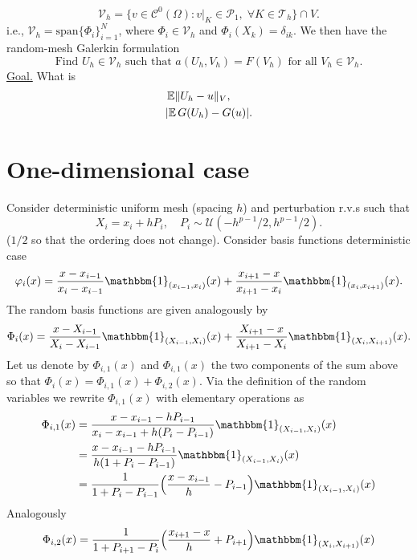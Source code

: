 \documentclass{siamart1116}
\numberwithin{theorem}{section}
\DeclarePairedDelimiter{\abs}{\lvert}{\rvert}
\DeclarePairedDelimiter{\norm}{\|}{\|}
\renewcommand{\phi}{\varphi}
\newcommand{\E}{\operatorname{\mathbb{E}}}
\newcommand{\ind}[1]{\mathbbm{1}_{#1}}
\begin{document}
\begin{equation}
	\mathcal{V}_h = \{v \in \mathcal{C}^0(\Omega) \colon v|_{K} \in \mathcal{P}_1, \; \forall K \in \mathcal{T}_h\} \cap V.
\end{equation}
i.e., $\mathcal{V}_h = \mathrm{span}\{\Phi_i\}_{i=1}^N$, where $\Phi_i \in \mathcal{V}_h$ and $\Phi_i(X_k) = \delta_{ik}$. We then have the random-mesh Galerkin formulation
\begin{equation}
	\text{Find } U_h \in \mathcal{V}_h \text{ such that } a(U_h,V_h) = F(V_h) \text{ for all } V_h \in \mathcal{V}_h.
\end{equation}
\underline{Goal.} What is
\begin{align}
	&\E \norm{U_h - u}_V, \\
	&\abs{\E G(U_h) - G(u)}. 
\end{align}

\section{One-dimensional case} Consider deterministic uniform mesh (spacing $h$) and perturbation r.v.s  such that
\begin{equation}
	X_i = x_i + hP_i, \quad P_i \sim \mathcal{U}(-h^{p-1}/2, h^{p-1}/2).
\end{equation}
($1/2$ so that the ordering does not change). Consider basis functions deterministic case
\begin{equation}
	\phi_i(x) =	\frac{x - x_{i-1}}{x_i - x_{i-1}} \ind{(x_{i-1}, x_i)}(x) + \frac{x_{i+1} - x}{x_{i+1} - x_i} \ind{(x_i, x_{i+1})}(x).
\end{equation}
The random basis functions are given analogously by
\begin{equation}
\Phi_i(x) =	\frac{x - X_{i-1}}{X_i - X_{i-1}} \ind{(X_{i-1},X_i)}(x) + \frac{X_{i+1} - x}{X_{i+1} - X_i}\ind{(X_i, X_{i+1})}(x). 
\end{equation}
Let us denote by $\Phi_{i,1}(x)$ and $\Phi_{i,1}(x)$ the two components of the sum above so that $\Phi_i(x) = \Phi_{i, 1}(x) + \Phi_{i, 2}(x)$. Via the definition of the random variables we rewrite $\Phi_{i, 1}(x)$ with elementary operations as 
\begin{equation}
\begin{aligned}
	\Phi_{i, 1}(x) &= \frac{x - x_{i-1} - hP_{i-1}}{x_i - x_{i-1} + h(P_i - P_{i-1})}\ind{(X_{i-1},X_i)}(x) \\
	&= \frac{x - x_{i-1} - hP_{i-1}}{h(1 + P_i - P_{i-1})}\ind{(X_{i-1},X_i)}(x) \\
	&= \frac{1}{1 + P_i - P_{i-1}}\Big(\frac{x - x_{i-1}}{h} - P_{i-1}\Big)\ind{(X_{i-1},X_i)}(x)
\end{aligned}
\end{equation}
Analogously 
\begin{equation}
	\Phi_{i, 2}(x) = \frac{1}{1 + P_{i+1} - P_i}\Big(\frac{x_{i+1} - x}{h} + P_{i+1}\Big)\ind{(X_i,X_{i+1})}(x)
\end{equation}



%
%
\end{document}
